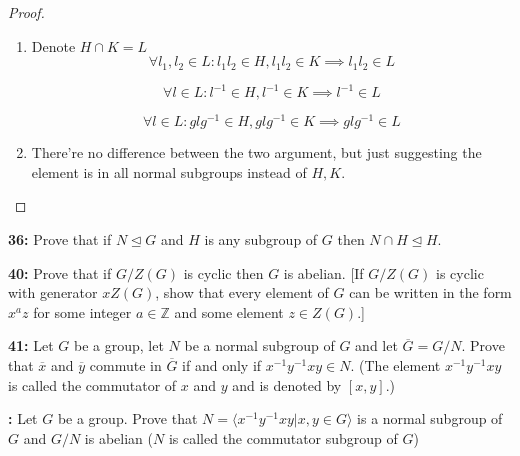 \documentclass[11pt]{article}
\newenvironment{exercise}[1]
	{\noindent \textbf{#1:}}
	{\par \vspace{0.5\baselineskip}}
\begin{document}
\begin{proof}
	\begin{enumerate}[label=\emph{\alph*}]
		\item Denote $H \cap K = L$
		      \[
			      \forall l_1, l_2 \in L: l_1l_2 \in H, l_1l_2 \in K \implies l_1l_2 \in L
		      \]

		      \[
			      \forall l \in L: l^{-1} \in H, l^{-1} \in K \implies l^{-1} \in L
		      \]

		      \[
			      \forall l \in L: glg^{-1} \in H, glg^{-1} \in K \implies glg^{-1} \in L
		      \]
		\item There're no difference between the two argument, but just suggesting the element is in all normal subgroups instead of $H,K$.
	\end{enumerate}
\end{proof}

\begin{exercise}{36}
	\textsf{Prove that if \(N \trianglelefteq G\) and \(H\) is any subgroup of \(G\) then \(N \cap H \trianglelefteq H\).}
\end{exercise}{}

\begin{exercise}{40}
	Prove that if \(G/Z(G)\) is cyclic then \(G\) is abelian. [If \(G/Z(G)\) is cyclic with generator \(xZ(G)\), show that every element of \(G\) can be written in the form \(x^{a}z\) for some integer \(a \in \mathbb{Z}\) and some element \(z \in Z(G)\).]
\end{exercise}{}

\begin{exercise}{41}
	\textsf{Let \(G\) be a group, let \(N\) be a normal subgroup of \(G\) and let \(\overline{G} = G/N\). Prove that \(\overline{x}\) and \(\overline{y}\) commute in \(\overline{G}\) if and only if \(x^{-1}y^{-1}xy \in N\). (The element \(x^{-1}y^{-1}xy\) is called the commutator of \(x\) and \(y\) and is denoted by \([x, y]\).)}
\end{exercise}{}

\begin{exercise}{}
	\textsf{Let \(G\) be a group. Prove that \(N = \langle x^{-1}y^{-1} xy | x, y \in G \rangle\) is a normal subgroup of \(G\) and \(G / N\) is abelian (\(N\) is called the commutator subgroup of \(G\))}
\end{exercise}{}
\end{document}
